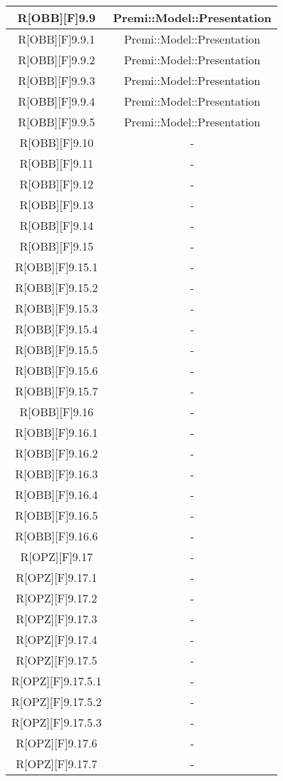 \begin{table}[h]
	\begin{center}
		\begin{tabular}{|c|c|}
			\toprule
			R[OBB][F]9.9 & Premi::Model::Presentation\\
		\midrule
			R[OBB][F]9.9.1 & Premi::Model::Presentation\\
		\midrule
			R[OBB][F]9.9.2 & Premi::Model::Presentation\\
		\midrule
			R[OBB][F]9.9.3 & Premi::Model::Presentation\\
		\midrule
			R[OBB][F]9.9.4 & Premi::Model::Presentation\\
		\midrule
			R[OBB][F]9.9.5 & Premi::Model::Presentation\\
		\midrule
			R[OBB][F]9.10 & -\\
		\midrule
			R[OBB][F]9.11 & -\\
		\midrule
			R[OBB][F]9.12 & -\\
		\midrule
			R[OBB][F]9.13 & -\\
		\midrule
			R[OBB][F]9.14 & -\\
		\midrule
			R[OBB][F]9.15 & -\\
		\midrule
			R[OBB][F]9.15.1 & -\\
		\midrule
			R[OBB][F]9.15.2 & -\\
		\midrule
			R[OBB][F]9.15.3 & -\\
		\midrule
			R[OBB][F]9.15.4 & -\\
		\midrule
			R[OBB][F]9.15.5 & -\\
		\midrule
			R[OBB][F]9.15.6 & -\\
		\midrule
			R[OBB][F]9.15.7 & -\\
		\midrule
			R[OBB][F]9.16 & -\\
		\midrule
			R[OBB][F]9.16.1 & -\\
		\midrule
			R[OBB][F]9.16.2 & -\\
		\midrule
			R[OBB][F]9.16.3 & -\\
		\midrule
			R[OBB][F]9.16.4 & -\\
		\midrule
			R[OBB][F]9.16.5 & -\\
		\midrule
			R[OBB][F]9.16.6 & -\\
		\midrule
			R[OPZ][F]9.17 & -\\
		\midrule
			R[OPZ][F]9.17.1 & -\\
		\midrule
			R[OPZ][F]9.17.2 & -\\
		\midrule
			R[OPZ][F]9.17.3 & -\\
		\midrule
			R[OPZ][F]9.17.4 & -\\
		\midrule
			R[OPZ][F]9.17.5 & -\\
		\midrule
			R[OPZ][F]9.17.5.1 & -\\
		\midrule
			R[OPZ][F]9.17.5.2 & -\\
		\midrule
			R[OPZ][F]9.17.5.3 & -\\
		\midrule
			R[OPZ][F]9.17.6 & -\\
		\midrule
			R[OPZ][F]9.17.7 & -\\
		\bottomrule
		\end{tabular}
	\end{center}
\end{table}


